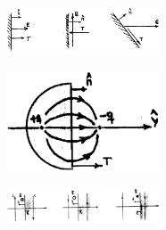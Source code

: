 \documentclass[10pt,oneside]{CBFT_book}
\begin{document}
\begin{figure}[htb]
	\begin{center}
	\includegraphics[width=0.4\textwidth]{images/fig_ft1_tensorM3.pdf}	 
	\end{center}
	\caption{}
\end{figure} 

\begin{figure}[htb]
	\begin{center}
	\includegraphics[width=0.4\textwidth]{images/fig_ft1_tensorM4.pdf}	 
	\end{center}
	\caption{}
\end{figure} 

\begin{figure}[htb]
	\begin{center}
	\includegraphics[width=0.4\textwidth]{images/fig_ft1_tensorM5.pdf}	 
	\end{center}
	\caption{}
\end{figure} 



\end{document}
